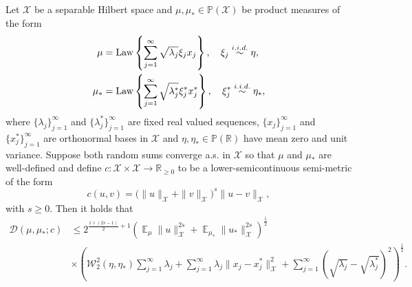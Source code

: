 \documentclass[final]{siamart171218}
\newcommand{\mcl}{\mathcal}
\newcommand{\mbb}{\mathbb}
\newcommand{\dd}{\text{d}}
\newcommand{\mX}{\mcl{X}}
\newcommand{\PP}{\mbb{P}}
\DeclareMathOperator{\E}{\mathbb E}
\newcommand{\K}{\mathcal{D}}
\newcommand{\W}{\mathcal{W}}
\newcommand{\Law}{{\rm Law}}
\newcommand{\iidsim}{\stackrel{i.i.d.}{\sim}}
\begin{document}
\begin{lemma}\label{lem:product-prior-coupling}
  Let $\mX$ be a separable Hilbert space and $\mu, \mu_\ast \in \PP(\mX)$ be product measures of the form 
  \begin{equation*}
    \begin{aligned}
      \mu & = \Law \left\{ \sum_{j=1}^\infty \sqrt{\lambda_j} \xi_j x_j \right\},  \quad
      \xi_j \iidsim \eta, \\
 \mu_\ast& = \Law \left\{ \sum_{j=1}^\infty \sqrt{\lambda^\ast_j} \xi^\ast_j
 x^\ast_j \right\}, \quad \xi_j^\ast \iidsim \eta_\ast, 
\end{aligned}
  \end{equation*}
where $\{ \lambda_j\}_{j=1}^\infty$ and $\{ \lambda^\ast_j\}_{j=1}^\infty$ are fixed
real valued sequences, $\{x_j\}_{j=1}^\infty$ and $\{x_j^\ast\}_{j=1}^\infty$
are  orthonormal bases in $\mX$ and  $\eta, \eta_\ast \in \PP(\mbb R)$ have mean zero and
unit variance. Suppose both random
sums converge a.s. in $\mX$  so that $\mu$ and $\mu_\ast$ are well-defined and define
$c: \mX \times \mX \to \mbb R_{\ge 0 }$ to  be a lower-semicontinuous semi-metric of the form 
\begin{equation*}
  c(u,v) = \Big( \| u\|_\mX + \| v\|_\mX \Big)^s \| u -v \|_\mX,
\end{equation*}
with $s \ge 0$. Then it holds that 
\begin{equation*}
  \begin{aligned}
  \K (\mu, \mu_\ast; c) & \le
  2^{\frac{1 \vee (2 s -1)}{2} + 1}
  \left( \E_\mu\| u\|_\mX^{2s} + \E_{\mu_\ast} \| u_\ast \|_\mX^{2s} \right)^{\frac{1}{2}} \\
  & \times
  \left(  \W_2^2(\eta, \eta_\ast) \sum_{j=1}^\infty \lambda_j  +    \sum_{j=1}^\infty  
  \lambda_j \| x_j - x_j^\ast\|_\mX^2 + \sum_{j=1}^\infty \left( \sqrt{\lambda_j} - \sqrt{\lambda_j^\ast} \right)^2 \right)^{\frac{1}{2}}.
\end{aligned}
\end{equation*}
\end{lemma}
\end{document}
